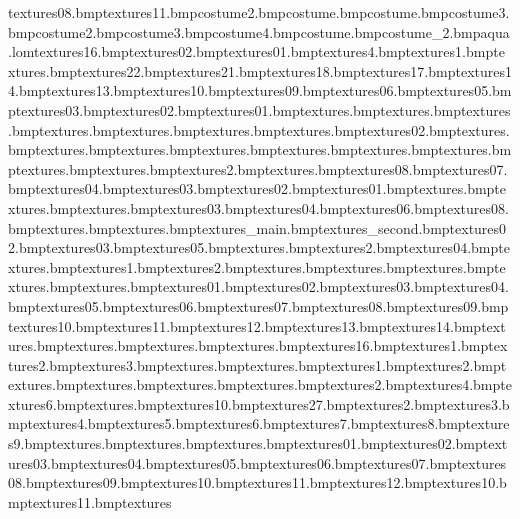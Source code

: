 textures\orsand08.bmp textures\lightsand11.bmp costume\bodyeyebrow2.bmp costume\noseshine.bmp costume\muzzlestubble.bmp costume\eyetex3.bmp costume\earslined2.bmp costume\bodytoes3.bmp costume\tongueline4.bmp costume\shadesshine.bmp costume_2.bmp aqua.lom textures\wpaper16.bmp textures\woodblock02.bmp textures\woodblock01.bmp textures\wbridge4.bmp textures\wbridge1.bmp textures\waterpiller.bmp textures\waterfall22.bmp textures\waterfall21.bmp textures\waterfall18.bmp textures\waterfall17.bmp textures\waterfall14.bmp textures\waterfall13.bmp textures\waterfall10.bmp textures\waterfall09.bmp textures\waterfall06.bmp textures\waterfall05.bmp textures\waterfall03.bmp textures\waterfall02.bmp textures\waterfall01.bmp textures\washshorts.bmp textures\washpants.bmp textures\washmglass.bmp textures\washmdrumb.bmp textures\washmdrum.bmp textures\washmdoor.bmp textures\washmbubbles.bmp textures\wanted02.bmp textures\tubedoor.bmp textures\treeplanks.bmp textures\tapwater.bmp textures\tapside.bmp textures\taphot.bmp textures\tapend.bmp textures\tapcold.bmp textures\tapbot.bmp textures\tap.bmp textures\strings2.bmp textures\steps.bmp textures\slide08.bmp textures\slide07.bmp textures\slide04.bmp textures\slide03.bmp textures\slide02.bmp textures\slide01.bmp textures\sinkshad.bmp textures\sinkscrews.bmp textures\sinkhole.bmp textures\anvil03.bmp textures\anvil04.bmp textures\anvil06.bmp textures\anvil08.bmp textures\aquafence.bmp textures\aquahutroof.bmp textures\aqua_main.bmp textures\aqua_second.bmp textures\bluhut02.bmp textures\bluhut03.bmp textures\bluhut05.bmp textures\bridgesand.bmp textures\bridgesand2.bmp textures\cablecar04.bmp textures\castle.bmp textures\castle1.bmp textures\castle2.bmp textures\castlebarrak.bmp textures\castledge.bmp textures\castleport.bmp textures\chain.bmp textures\chromehandle.bmp textures\dirttosand01.bmp textures\dirttosand02.bmp textures\dirttosand03.bmp textures\dirttosand04.bmp textures\dirttosand05.bmp textures\dirttosand06.bmp textures\dirttosand07.bmp textures\dirttosand08.bmp textures\dirttosand09.bmp textures\dirttosand10.bmp textures\dirttosand11.bmp textures\dirttosand12.bmp textures\dirttosand13.bmp textures\dirttosand14.bmp textures\drain.bmp textures\duck.bmp textures\entrance.bmp textures\flash.bmp textures\grasstosand16.bmp textures\grill1.bmp textures\grill2.bmp textures\grill3.bmp textures\hutwallpaper.bmp textures\hutwood.bmp textures\jetty1.bmp textures\jetty2.bmp textures\lhousedoor.bmp textures\lhouserailings.bmp textures\lhousewalkway.bmp textures\lhousewall.bmp textures\lhousewall2.bmp textures\lhousewall4.bmp textures\lhousewall6.bmp textures\light.bmp textures\lightsand10.bmp textures\sign27.bmp textures\lightsand2.bmp textures\lightsand3.bmp textures\lightsand4.bmp textures\lightsand5.bmp textures\lightsand6.bmp textures\lightsand7.bmp textures\lightsand8.bmp textures\lightsand9.bmp textures\logoaquaworld.bmp textures\nofish.bmp textures\nofishing.bmp textures\orangerock01.bmp textures\orangerock02.bmp textures\orangerock03.bmp textures\orangerock04.bmp textures\orangerock05.bmp textures\orangerock06.bmp textures\orangerock07.bmp textures\orangerock08.bmp textures\orangerock09.bmp textures\orangerock10.bmp textures\orangerock11.bmp textures\orangerock12.bmp textures\orangersand10.bmp textures\orangersand11.bmp textures\